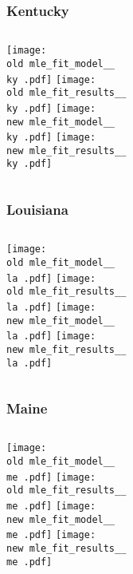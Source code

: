 \documentclass{beamer}
\newcommand{\old}{api-370-prod/pyseir/state_summaries/reports/}
\newcommand{\new}{new/pyseir/state_summaries/reports/}
\newcommand{\ky}{Kentucky__21}
\newcommand{\la}{Louisiana__22}
\newcommand{\me}{Maine__23}
\begin{document}
\begin{frame}
\frametitle{Kentucky}
    \begin{columns}[t]

       \texttt{[image: \\old mle\_fit\_model\_\_\\ky .pdf]}
       \texttt{[image: \\old mle\_fit\_results\_\_\\ky .pdf]}   
       \texttt{[image: \\new mle\_fit\_model\_\_\\ky .pdf]}
       \texttt{[image: \\new mle\_fit\_results\_\_\\ky .pdf]}   
\end{columns}
\end{frame}


\begin{frame}
\frametitle{Louisiana}
    \begin{columns}[t]

       \texttt{[image: \\old mle\_fit\_model\_\_\\la .pdf]}
       \texttt{[image: \\old mle\_fit\_results\_\_\\la .pdf]}   
       \texttt{[image: \\new mle\_fit\_model\_\_\\la .pdf]}
       \texttt{[image: \\new mle\_fit\_results\_\_\\la .pdf]}   
\end{columns}
\end{frame}

\begin{frame}
\frametitle{Maine}
    \begin{columns}[t]

       \texttt{[image: \\old mle\_fit\_model\_\_\\me .pdf]}
       \texttt{[image: \\old mle\_fit\_results\_\_\\me .pdf]}   
       \texttt{[image: \\new mle\_fit\_model\_\_\\me .pdf]}
       \texttt{[image: \\new mle\_fit\_results\_\_\\me .pdf]}   
\end{columns}
\end{frame}
\end{document}
